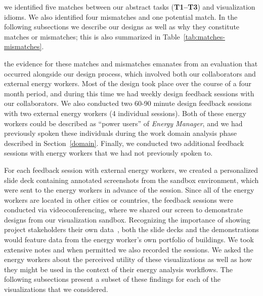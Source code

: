 \documentclass[journal]{vgtc}                %
\newcommand{\bstart}[1]{\vspace{1mm} \noindent{\textbf{#1:}}}
\begin{document}
\bstart{Matches \& mismatches} we identified five matches between our abstract tasks ({\bf T1--T3}) and visualization idioms. 
We also identified four mismatches and one potential match. 
In the following subsections we describe our designs as well as why they constitute matches or mismatches; this is also summarized in Table~\ref{tab:matches-mismatches}.

\bstart{Evaluation methodology} the evidence for these matches and mismatches emanates from an evaluation that occurred alongside our design process, which involved both our collaborators and external energy workers.
Most of the design took place over the course of a four month period, and during this time we had weekly design feedback sessions with our collaborators.
We also conducted two 60-90 minute design feedback sessions with two external energy workers (4 individual sessions).
Both of these energy workers could be described as ``power users'' of {\it Energy Manager}, and we had previously spoken these individuals during the work domain analysis phase described in Section~\ref{domain}.
Finally, we conducted two additional feedback sessions with energy workers that we had not previously spoken to.

For each feedback session with external energy workers, we created a personalized slide deck containing annotated screenshots from the sandbox environment, which were sent to the energy workers in advance of the session. 
Since all of the energy workers are located in other cities or countries, the feedback sessions were conducted via videoconferencing, where we shared our screen to demonstrate designs from our visualization sandbox.
Recognizing the importance of showing project stakeholders their own data~\cite{Lloyd2011}, both the slide decks and the demonstrations would feature data from the energy worker's own portfolio of buildings. 
We took extensive notes and when permitted we also recorded the sessions.
We asked the energy workers about the perceived utility of these visualizations as well as how they might be used in the context of their energy analysis workflows.
The following subsections present a subset of these findings for each of the visualizations that we considered.
\end{document}
